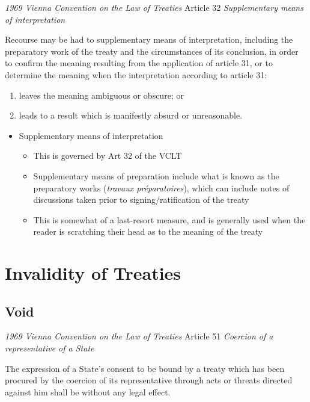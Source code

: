 \begin{conventiondetails}{\textit{1969 Vienna Convention on the Law of Treaties} Article 32}\label{VCLT Art 32}
    \flushleft
    \textit{Supplementary means of interpretation}

    \vspace{\baselineskip}

    Recourse may be had to supplementary means of interpretation, including the preparatory work of the treaty and the circumstances of its conclusion, in order to confirm the meaning resulting from the application of article 31, or to determine the meaning when the interpretation according to article 31:
    \begin{enumerate}[label=(\alph*)]
        \item leaves the meaning ambiguous or obscure; or 
        \item leads to a result which is manifestly absurd or unreasonable.
    \end{enumerate}
\end{conventiondetails}

\begin{itemize}
    \item Supplementary means of interpretation
    \begin{itemize}
        \item This is governed by Art 32 of the VCLT
        \item Supplementary means of preparation include what is known as the preparatory works (\textit{travaux préparatoires}), which can include notes of discussions taken prior to signing/ratification of the treaty
        \item This is somewhat of a last-resort measure, and is generally used when the reader is scratching their head as to the meaning of the treaty
    \end{itemize}
\end{itemize}

\section{Invalidity of Treaties}
\subsection{Void}
\begin{conventiondetails}{\textit{1969 Vienna Convention on the Law of Treaties} Article 51}\label{VCLT Art 51}
    \flushleft
    \textit{Coercion of a representative of a State}

    \vspace{\baselineskip}

    The expression of a State's consent to be bound by a treaty which has been procured by the  coercion of its representative through acts or threats directed against him shall be without any legal  effect.
\end{conventiondetails}

